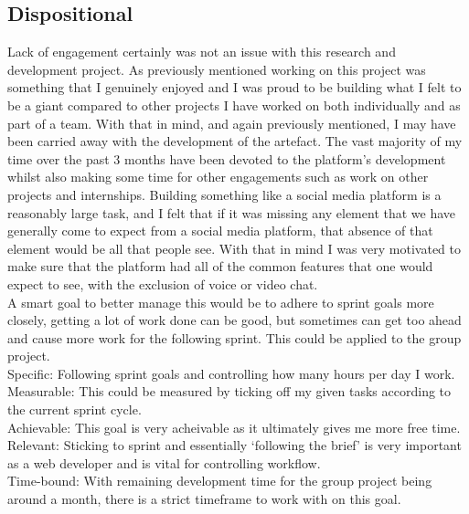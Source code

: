 \documentclass[lettersize,journal]{IEEEtran}
\begin{document}
\subsection{Dispositional}
Lack of engagement certainly was not an issue with this research and development project. As previously mentioned working on this project was something that I genuinely enjoyed and I was proud to be 
building what I felt to be a giant compared to other projects I have worked on both individually and as part of a team. With that in mind, and again previously mentioned, I may have been carried away with 
the development of the artefact. The vast majority of my time over the past 3 months have been devoted to the platform's development whilst also making some time for other engagements such as work on other 
projects and internships. Building something like a social media platform is a reasonably large task, and I felt that if it was missing any element that we have generally come to expect from a social media
platform, that absence of that element would be all that people see. With that in mind I was very motivated to make sure that the platform had all of the common features that one would expect to see, with 
the exclusion of voice or video chat.
\\ A smart goal to better manage this would be to adhere to sprint goals more closely, getting a lot of work done can be good, but sometimes can get too ahead and cause
more work for the following sprint. This could be applied to the group project.
\\Specific: Following sprint goals and controlling how many hours per day I work.
\\Measurable: This could be measured by ticking off my given tasks according to the current sprint cycle.
\\Achievable: This goal is very acheivable as it ultimately gives me more free time.
\\Relevant: Sticking to sprint and essentially `following the brief' is very important as a web developer and is vital for controlling workflow.
\\Time-bound: With remaining development time for the group project being around a month, there is a strict timeframe to work with on this goal.
\end{document}
